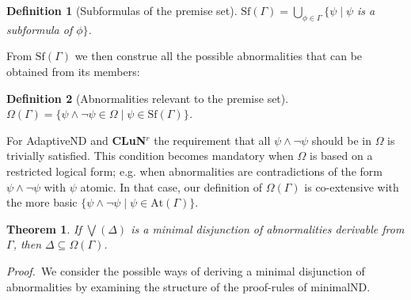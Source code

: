 \documentclass[]{article}
\newtheorem{definition}{Definition}
\newtheorem{theorem}{Theorem}
\newcommand{\Turn}[2]
    { {#1}\vdash_{\textbf{\sf s}}  {#2}}
\newcommand{\TurnPrime}[2]
    { {#1}\vdash_{\textbf{\sf s'}}  {#2}}
\newcommand{\Sf}{\ensuremath{\mathrm{Sf}}}
\newcommand{\At}{\ensuremath{\mathrm{At}}}
\begin{document}


\begin{definition}[Subformulas of the premise set]
$\Sf(\Gamma)=\bigcup_{\phi \in \Gamma} \{\psi \mid \psi$ is a subformula of $ \phi\}$.
\end{definition}


From $\Sf(\Gamma)$ we then construe all the possible abnormalities that can be obtained from its members:

\begin{definition}[Abnormalities relevant to the premise set]
$\Omega(\Gamma)=\{\psi\wedge \neg \psi \in \Omega \mid \psi\in \Sf(\Gamma)\}$.
\end{definition}
For \textsf{AdaptiveND} and \textbf{CLuN$^r$} the requirement that all $\psi\wedge \neg \psi$ should be in $\Omega$ is trivially satisfied. This condition becomes mandatory when $\Omega$ is based on a restricted logical form; e.g. when abnormalities are contradictions of the form $\psi \wedge \neg \psi$ with $\psi$ atomic. In that case, our definition of $\Omega(\Gamma)$ is co-extensive with the more basic $\{\psi \wedge \neg \psi \mid \psi \in \At(\Gamma)\}$.
%
%
\begin{theorem}\label{thm:subform}
    If $\bigvee(\Delta)$ is a minimal disjunction of abnormalities derivable from $\Gamma$, then $\Delta \subseteq \Omega(\Gamma)$.
\end{theorem}
\noindent\textsl{Proof.}~We consider the possible ways of deriving a minimal disjunction of abnormalities by examining the structure of the proof-rules of \textsf{minimalND}.
\end{document}

